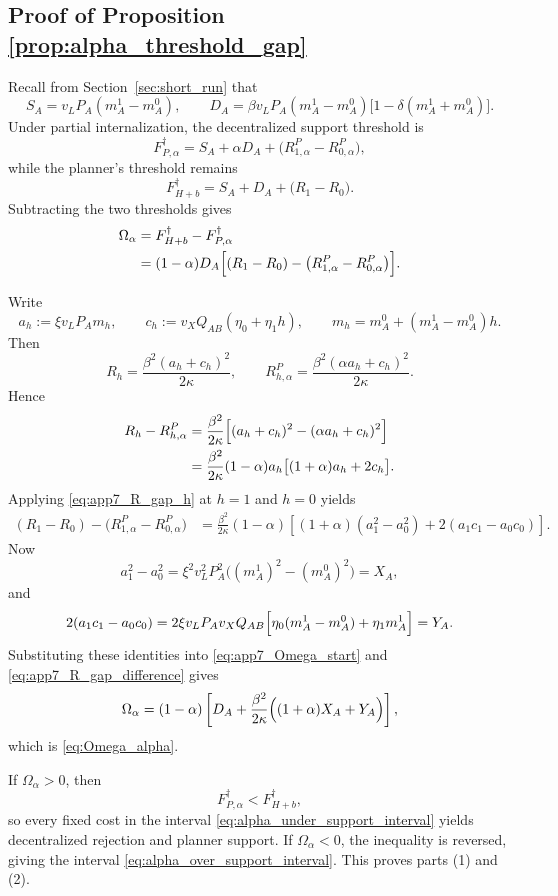 \subsection{Proof of Proposition \ref{prop:alpha_threshold_gap}}

Recall from Section~\ref{sec:short_run} that
\[
S_A=v_LP_A(m_A^1-m_A^0),
\qquad
D_A=\beta v_LP_A(m_A^1-m_A^0)\bigl[1-\delta(m_A^1+m_A^0)\bigr].
\]
Under partial internalization, the decentralized support threshold is
\[
F_{P,\alpha}^{\dagger}
=
S_A+\alpha D_A+\bigl(R_{1,\alpha}^P-R_{0,\alpha}^P\bigr),
\]
while the planner's threshold remains
\[
F_{H+b}^{\dagger}
=
S_A+D_A+\bigl(R_1-R_0\bigr).
\]
Subtracting the two thresholds gives
\begin{align}
\Omega_{\alpha}
&=
F_{H+b}^{\dagger}-F_{P,\alpha}^{\dagger}
\nonumber\\
&=
(1-\alpha)D_A
\Bigl[(R_1-R_0)-\bigl(R_{1,\alpha}^P-R_{0,\alpha}^P\bigr)\Bigr].
\label{eq:app7_Omega_start}
\end{align}

Write
\[
a_h:=\xi v_LP_Am_h,
\qquad
c_h:=v_XQ_{AB}(\eta_0+\eta_1 h),
\qquad
m_h=m_A^0+(m_A^1-m_A^0)h.
\]
Then
\[
R_h=\frac{\beta^2(a_h+c_h)^2}{2\kappa},
\qquad
R_{h,\alpha}^P=\frac{\beta^2(\alpha a_h+c_h)^2}{2\kappa}.
\]
Hence
\begin{align}
R_h-R_{h,\alpha}^P
&=
\frac{\beta^2}{2\kappa}
\Bigl[(a_h+c_h)^2-(\alpha a_h+c_h)^2\Bigr]
\nonumber\\
&=
\frac{\beta^2}{2\kappa}(1-\alpha)a_h\bigl[(1+\alpha)a_h+2c_h\bigr].
\label{eq:app7_R_gap_h}
\end{align}
Applying \eqref{eq:app7_R_gap_h} at $h=1$ and $h=0$ yields
\begin{align}
(R_1-R_0)-\bigl(R_{1,\alpha}^P-R_{0,\alpha}^P\bigr)
&=
\frac{\beta^2}{2\kappa}(1-\alpha)
\left[
(1+\alpha)(a_1^2-a_0^2)+2(a_1c_1-a_0c_0)
\right].
\label{eq:app7_R_gap_difference}
\end{align}
Now
\[
a_1^2-a_0^2
=
\xi^2 v_L^2P_A^2\bigl((m_A^1)^2-(m_A^0)^2\bigr)
=
X_A,
\]
and
\[
2(a_1c_1-a_0c_0)
=
2\xi v_LP_A v_XQ_{AB}\Bigl[\eta_0(m_A^1-m_A^0)+\eta_1m_A^1\Bigr]
=
Y_A.
\]
Substituting these identities into \eqref{eq:app7_Omega_start} and \eqref{eq:app7_R_gap_difference} gives
\[
\Omega_{\alpha}
=
(1-\alpha)
\left[
D_A+\frac{\beta^2}{2\kappa}\Bigl((1+\alpha)X_A+Y_A\Bigr)
\right],
\]
which is \eqref{eq:Omega_alpha}.

If $\Omega_{\alpha}>0$, then
\[
F_{P,\alpha}^{\dagger}<F_{H+b}^{\dagger},
\]
so every fixed cost in the interval \eqref{eq:alpha_under_support_interval} yields decentralized rejection and planner support. If $\Omega_{\alpha}<0$, the inequality is reversed, giving the interval \eqref{eq:alpha_over_support_interval}. This proves parts (1) and (2).

